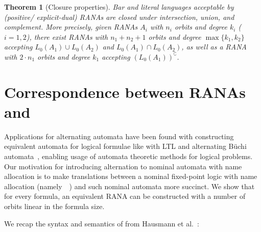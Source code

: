 \documentclass[10pt,a4paper]{amsart}
\newtheorem{theo}{Theorem}[section]
\theoremstyle{definition}
\renewcommand{\textsf}[1]{{\oldtextsf{\small#1}}}
\newcommand{\muBar}{\mbox{\textsf{Bar-$\mu$TL}}\xspace}
\begin{document}
\begin{theo}[Closure properties] \label{thm:closure} Bar and literal
  languages acceptable by (positive/ explicit-dual) RANAs are closed
  under intersection, union, and complement. More precisely, given RANAs $A_i$ with $n_i$ orbits and degree $k_i$ ($i=1,2$), there exist RANAs with $n_1+n_2+1$ orbits and degree $\max\{k_1,k_2\}$ accepting $L_0(A_1)\cup L_0(A_2)$ and $L_0(A_1)\cap L_0(A_2)$, as well as a RANA with $2\cdot n_1$ orbits and degree $k_1$ accepting $(L_0(A_1))^\complement$.
\end{theo}


\section{Correspondence between RANAs and \muBar}\label{sec:logic}

Applications for alternating automata have been found with constructing equivalent
automata for logical formulae like with LTL and alternating Büchi automata~\cite{mss88,var94}, enabling usage of automata theoretic methods
for logical problems.
Our motivation for introducing alternation to nominal automata with name allocation is to
make translations between a nominal fixed-point logic with name allocation (namely~\muBar~\cite{hms21})
and such nominal automata more succinct. We show that for every \muBar formula, an equivalent
RANA can be constructed with a number of orbits linear in the formula size.

We recap the syntax and semantics of \muBar from Hausmann et al.~\cite{hms21}:
\end{document}
